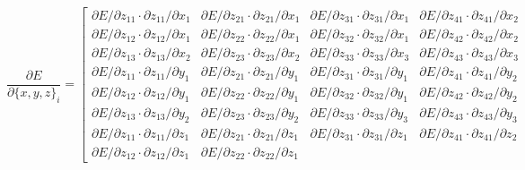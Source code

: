 \documentclass{article}
\begin{document}
\begin{equation}
\frac{\partial{E}}{\partial{\{x, y, z\}_i}} = \left[\begin{array}{cccc}
\partial{E} / \partial{z_{11}} \cdot \partial{z_{11}} / \partial{x_1} & 
\partial{E} / \partial{z_{21}} \cdot \partial{z_{21}} / \partial{x_1} &
\partial{E} / \partial{z_{31}} \cdot \partial{z_{31}} / \partial{x_1} & 
\partial{E} / \partial{z_{41}} \cdot \partial{z_{41}} / \partial{x_2} \\
\partial{E} / \partial{z_{12}} \cdot \partial{z_{12}} / \partial{x_1} & 
\partial{E} / \partial{z_{22}} \cdot \partial{z_{22}} / \partial{x_1} &
\partial{E} / \partial{z_{32}} \cdot \partial{z_{32}} / \partial{x_1} & 
\partial{E} / \partial{z_{42}} \cdot \partial{z_{42}} / \partial{x_2} \\
\partial{E} / \partial{z_{13}} \cdot \partial{z_{13}} / \partial{x_2} & 
\partial{E} / \partial{z_{23}} \cdot \partial{z_{23}} / \partial{x_2} &
\partial{E} / \partial{z_{33}} \cdot \partial{z_{33}} / \partial{x_3} & 
\partial{E} / \partial{z_{43}} \cdot \partial{z_{43}} / \partial{x_3} \\
\partial{E} / \partial{z_{11}} \cdot \partial{z_{11}} / \partial{y_1} & 
\partial{E} / \partial{z_{21}} \cdot \partial{z_{21}} / \partial{y_1} &
\partial{E} / \partial{z_{31}} \cdot \partial{z_{31}} / \partial{y_1} & 
\partial{E} / \partial{z_{41}} \cdot \partial{z_{41}} / \partial{y_2} \\
\partial{E} / \partial{z_{12}} \cdot \partial{z_{12}} / \partial{y_1} & 
\partial{E} / \partial{z_{22}} \cdot \partial{z_{22}} / \partial{y_1} &
\partial{E} / \partial{z_{32}} \cdot \partial{z_{32}} / \partial{y_1} & 
\partial{E} / \partial{z_{42}} \cdot \partial{z_{42}} / \partial{y_2} \\
\partial{E} / \partial{z_{13}} \cdot \partial{z_{13}} / \partial{y_2} & 
\partial{E} / \partial{z_{23}} \cdot \partial{z_{23}} / \partial{y_2} &
\partial{E} / \partial{z_{33}} \cdot \partial{z_{33}} / \partial{y_3} & 
\partial{E} / \partial{z_{43}} \cdot \partial{z_{43}} / \partial{y_3} \\
\partial{E} / \partial{z_{11}} \cdot \partial{z_{11}} / \partial{z_1} & 
\partial{E} / \partial{z_{21}} \cdot \partial{z_{21}} / \partial{z_1} &
\partial{E} / \partial{z_{31}} \cdot \partial{z_{31}} / \partial{z_1} & 
\partial{E} / \partial{z_{41}} \cdot \partial{z_{41}} / \partial{z_2} \\
\partial{E} / \partial{z_{12}} \cdot \partial{z_{12}} / \partial{z_1} & 
\partial{E} / \partial{z_{22}} \cdot \partial{z_{22}} / \partial{z_1} &

\end{array}
\end{equation}
\end{document}
